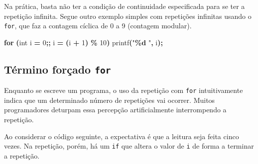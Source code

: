 \documentclass[
  11pt,
  a4paper,
]{scrbook}
\newenvironment{Shaded}{\begin{snugshade}}{\end{snugshade}}
\newcommand{\ControlFlowTok}[1]{\textcolor[rgb]{0.13,0.29,0.53}{\textbf{#1}}}
\newcommand{\DataTypeTok}[1]{\textcolor[rgb]{0.13,0.29,0.53}{#1}}
\newcommand{\DecValTok}[1]{\textcolor[rgb]{0.00,0.00,0.81}{#1}}
\newcommand{\NormalTok}[1]{#1}
\newcommand{\OperatorTok}[1]{\textcolor[rgb]{0.81,0.36,0.00}{\textbf{#1}}}
\newcommand{\SpecialCharTok}[1]{\textcolor[rgb]{0.81,0.36,0.00}{\textbf{#1}}}
\newcommand{\StringTok}[1]{\textcolor[rgb]{0.31,0.60,0.02}{#1}}
\begin{document}
Na prática, basta não ter a condição de continuidade especificada para
se ter a repetição infinita. Segue outro exemplo simples com repetições
infinitas usando o \texttt{for}, que faz a contagem cíclica de 0 a 9
(contagem modular).

\begin{Shaded}
\begin{Highlighting}[]
\ControlFlowTok{for} \OperatorTok{(}\DataTypeTok{int}\NormalTok{ i }\OperatorTok{=} \DecValTok{0}\OperatorTok{;;}\NormalTok{ i }\OperatorTok{=} \OperatorTok{(}\NormalTok{i }\OperatorTok{+} \DecValTok{1}\OperatorTok{)} \OperatorTok{\%} \DecValTok{10}\OperatorTok{)}
\NormalTok{    printf}\OperatorTok{(}\StringTok{"}\SpecialCharTok{\%d}\StringTok{ "}\OperatorTok{,}\NormalTok{ i}\OperatorTok{);}
\end{Highlighting}
\end{Shaded}

\subsection{\texorpdfstring{Término forçado
\texttt{for}}{Término forçado for}}\label{tuxe9rmino-foruxe7ado-for}

Enquanto se escreve um programa, o uso da repetição com \texttt{for}
intuitivamente indica que um determinado número de repetições vai
ocorrer. Muitos programadores deturpam essa percepção artificialmente
interrompendo a repetição.

Ao considerar o código seguinte, a expectativa é que a leitura seja
feita cinco vezes. Na repetição, porém, há um \texttt{if} que altera o
valor de \texttt{i} de forma a terminar a repetição.
\end{document}
